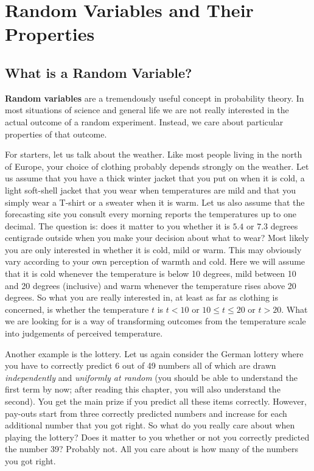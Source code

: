 \chapter{Random Variables and Their Properties}

\section{What is a Random Variable?}
\textbf{Random variables} are a tremendously useful concept in probability theory. In most situations of
science and general life we are not really interested in the actual outcome of a random experiment. Instead,
we care about particular properties of that outcome.

For starters, let us talk about the weather. 
Like most people living in the north of Europe, your choice of clothing
probably depends strongly on the weather. Let us assume that you have a thick winter jacket that you
put on when it is cold, a light soft-shell jacket that you wear when temperatures are mild and that you
simply wear a T-shirt or a sweater when it is warm. Let us also assume that the forecasting site you
consult every morning reports the temperatures up to one decimal. The question is: does it matter to you
whether it is $ 5.4 $ or $ 7.3 $ degrees centigrade outside when you make your decision about what to wear?
Most likely you are only interested in whether it is cold, mild or warm. This may obviously vary according
to your own perception of warmth and cold. Here we will assume that it is cold whenever the temperature
is below 10 degrees, mild between 10 and 20 degrees (inclusive) and warm whenever the temperature rises
above 20 degrees. So what you are really interested in, at least as far as clothing is concerned, is 
whether the temperature $ t $ is $ t < 10 $ or $ 10 \leq t \leq 20 $ or $ t > 20 $. What we are looking for
is a way of transforming outcomes from the temperature scale into judgements of perceived temperature.

Another example is the lottery. Let us again consider the German lottery where you have to correctly 
predict 6 out of 49 numbers all of which are drawn \textit{independently} 
and \textit{uniformly at random} (you should be able to understand the first term by now; after reading
this chapter, you will also understand the second). You get the main prize if you predict all these items
correctly. However, pay-outs start from three correctly predicted numbers and increase for each additional
number that you got right. So what do you really care about when playing the lottery? Does it matter to
you whether or not you correctly predicted the number 39? Probably not. All you care about is how many of
the numbers you got right.

